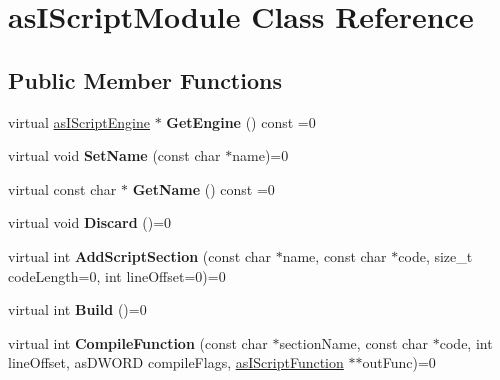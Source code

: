 \hypertarget{classas_i_script_module}{}\section{as\+I\+Script\+Module Class Reference}
\label{classas_i_script_module}
\subsection*{Public Member Functions}
\begin{DoxyCompactItemize}
\item 
\mbox{\label{classas_i_script_module_aef861826f4d09fd411aee7792854bfb8}} 
virtual \hyperlink{classas_i_script_engine}{as\+I\+Script\+Engine} $\ast$ {\bfseries Get\+Engine} () const =0
\item 
\mbox{\label{classas_i_script_module_a1a7534bace9eefdc3175a1999f9cbf4a}} 
virtual void {\bfseries Set\+Name} (const char $\ast$name)=0
\item 
\mbox{\label{classas_i_script_module_a4967db3ed89836ac2f3b529c499d473d}} 
virtual const char $\ast$ {\bfseries Get\+Name} () const =0
\item 
\mbox{\label{classas_i_script_module_a0e6a69be59f16c8b51d1e21d3905d95c}} 
virtual void {\bfseries Discard} ()=0
\item 
\mbox{\label{classas_i_script_module_a330835919b565c76c25e9425536f50b7}} 
virtual int {\bfseries Add\+Script\+Section} (const char $\ast$name, const char $\ast$code, size\+\_\+t code\+Length=0, int line\+Offset=0)=0
\item 
\mbox{\label{classas_i_script_module_a8acf107194c5f079d7f7507309ebe613}} 
virtual int {\bfseries Build} ()=0
\item 
\mbox{\label{classas_i_script_module_a1258d7cfeed965f36ba312beeb49e81c}} 
virtual int {\bfseries Compile\+Function} (const char $\ast$section\+Name, const char $\ast$code, int line\+Offset, as\+D\+W\+O\+RD compile\+Flags, \hyperlink{classas_i_script_function}{as\+I\+Script\+Function} $\ast$$\ast$out\+Func)=0
$$
\end{DoxyCompactItemize}
